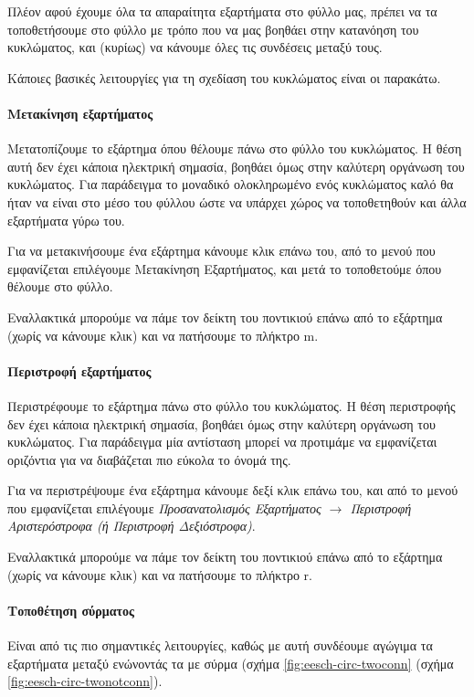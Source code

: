\documentclass[a4paper]{article}
\begin{document}
Πλέον αφού έχουμε όλα τα απαραίτητα εξαρτήματα στο φύλλο μας, πρέπει να τα τοποθετήσουμε στο φύλλο με τρόπο που να μας βοηθάει στην κατανόηση του κυκλώματος, και (κυρίως) να κάνουμε όλες τις συνδέσεις μεταξύ τους.

Κάποιες βασικές λειτουργίες για τη σχεδίαση του κυκλώματος είναι οι παρακάτω.

\paragraph{Μετακίνηση εξαρτήματος}
Μετατοπίζουμε το εξάρτημα όπου θέλουμε πάνω στο φύλλο του κυκλώματος. Η θέση αυτή δεν έχει κάποια ηλεκτρική σημασία, βοηθάει όμως στην καλύτερη οργάνωση του κυκλώματος. Για παράδειγμα το μοναδικό ολοκληρωμένο ενός κυκλώματος καλό θα ήταν να είναι στο μέσο του φύλλου ώστε να υπάρχει χώρος να τοποθετηθούν και άλλα εξαρτήματα γύρω του.

Για να μετακινήσουμε ένα εξάρτημα κάνουμε κλικ επάνω του, από το μενού που εμφανίζεται επιλέγουμε Μετακίνηση Εξαρτήματος, και μετά το τοποθετούμε όπου θέλουμε στο φύλλο. 

Εναλλακτικά μπορούμε να πάμε τον δείκτη του ποντικιού επάνω από το εξάρτημα (χωρίς να κάνουμε κλικ) και να πατήσουμε το πλήκτρο m.

\paragraph{Περιστροφή εξαρτήματος}
Περιστρέφουμε το εξάρτημα πάνω στο φύλλο του κυκλώματος. Η θέση περιστροφής δεν έχει κάποια ηλεκτρική σημασία, βοηθάει όμως στην καλύτερη οργάνωση του κυκλώματος. Για παράδειγμα μία αντίσταση μπορεί να προτιμάμε να εμφανίζεται οριζόντια για να διαβάζεται πιο εύκολα το όνομά της.

Για να περιστρέψουμε ένα εξάρτημα κάνουμε δεξί κλικ επάνω του, και από το μενού που εμφανίζεται επιλέγουμε \textit{Προσανατολισμός Εξαρτήματος $\rightarrow$ Περιστροφή Αριστερόστροφα (ή Περιστροφή Δεξιόστροφα)}. 

Εναλλακτικά μπορούμε να πάμε τον δείκτη του ποντικιού επάνω από το εξάρτημα (χωρίς να κάνουμε κλικ) και να πατήσουμε το πλήκτρο r.

\paragraph{Τοποθέτηση σύρματος}
Είναι από τις πιο σημαντικές λειτουργίες, καθώς με αυτή συνδέουμε αγώγιμα τα εξαρτήματα μεταξύ ενώνοντάς τα με σύρμα (σχήμα \ref{fig:eesch-circ-twoconn} (σχήμα \ref{fig:eesch-circ-twonotconn}).
\end{document}
